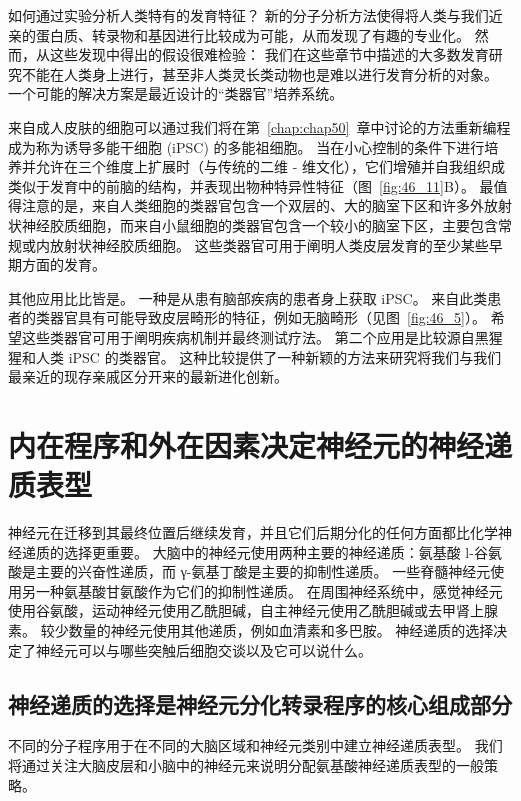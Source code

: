 如何通过实验分析人类特有的发育特征？
新的分子分析方法使得将人类与我们近亲的蛋白质、转录物和基因进行比较成为可能，从而发现了有趣的专业化。
然而，从这些发现中得出的假设很难检验：
我们在这些章节中描述的大多数发育研究不能在人类身上进行，甚至非人类灵长类动物也是难以进行发育分析的对象。
一个可能的解决方案是最近设计的“类器官”培养系统。


来自成人皮肤的细胞可以通过我们将在第~\ref{chap:chap50}~章中讨论的方法重新编程成为称为诱导多能干细胞 (iPSC) 的多能祖细胞。
当在小心控制的条件下进行培养并允许在三个维度上扩展时（与传统的二维 - 维文化），它们增殖并自我组织成类似于发育中的前脑的结构，并表现出物种特异性特征（图~\ref{fig:46_11}B）。
最值得注意的是，来自人类细胞的类器官包含一个双层的、大的脑室下区和许多外放射状神经胶质细胞，而来自小鼠细胞的类器官包含一个较小的脑室下区，主要包含常规或内放射状神经胶质细胞。
这些类器官可用于阐明人类皮层发育的至少某些早期方面的发育。


其他应用比比皆是。
一种是从患有脑部疾病的患者身上获取 iPSC。
来自此类患者的类器官具有可能导致皮层畸形的特征，例如无脑畸形（见图~\ref{fig:46_5}）。
希望这些类器官可用于阐明疾病机制并最终测试疗法。
第二个应用是比较源自黑猩猩和人类 iPSC 的类器官。
这种比较提供了一种新颖的方法来研究将我们与我们最亲近的现存亲戚区分开来的最新进化创新。



\section{内在程序和外在因素决定神经元的神经递质表型}

神经元在迁移到其最终位置后继续发育，并且它们后期分化的任何方面都比化学神经递质的选择更重要。
大脑中的神经元使用两种主要的神经递质：氨基酸 l-谷氨酸是主要的兴奋性递质，而 γ-氨基丁酸是主要的抑制性递质。
一些脊髓神经元使用另一种氨基酸甘氨酸作为它们的抑制性递质。
在周围神经系统中，感觉神经元使用谷氨酸，运动神经元使用乙酰胆碱，自主神经元使用乙酰胆碱或去甲肾上腺素。
较少数量的神经元使用其他递质，例如血清素和多巴胺。
神经递质的选择决定了神经元可以与哪些突触后细胞交谈以及它可以说什么。



\subsection{神经递质的选择是神经元分化转录程序的核心组成部分}

不同的分子程序用于在不同的大脑区域和神经元类别中建立神经递质表型。
我们将通过关注大脑皮层和小脑中的神经元来说明分配氨基酸神经递质表型的一般策略。


